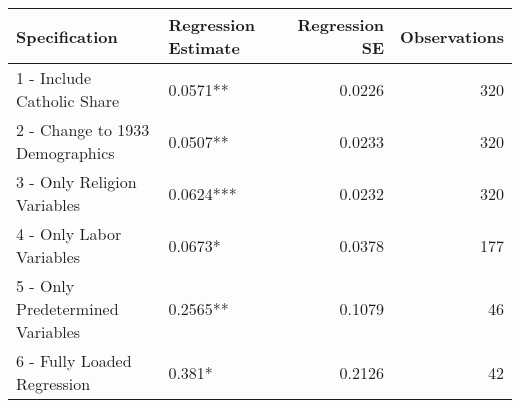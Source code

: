 \begin{tabular}{llrr}
\toprule
                   Specification & Regression Estimate &  Regression SE &  Observations \\
\midrule
      1 - Include Catholic Share &            0.0571** &         0.0226 &           320 \\
 2 - Change to 1933 Demographics &            0.0507** &         0.0233 &           320 \\
     3 - Only Religion Variables &           0.0624*** &         0.0232 &           320 \\
        4 - Only Labor Variables &             0.0673* &         0.0378 &           177 \\
5 - Only Predetermined Variables &            0.2565** &         0.1079 &            46 \\
     6 - Fully Loaded Regression &              0.381* &         0.2126 &            42 \\
\bottomrule
\end{tabular}
